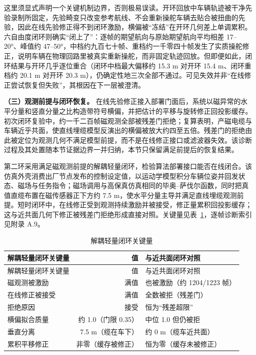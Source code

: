 这里须显式声明一个关键机制边界，否则极易误读。开环回放中车辆轨迹被干净先验录制所固定，先验畸变只改变参考航线、不会重新操舵车辆去贴合被扭曲的先验，因此在线先验修正得不到闭环激励，横偏被``冻结''在开环几何差上单调累积。六自由度闭环则确实``闭上了''：逐帧的期望航向与原始期望航向平均相差 17--20°、峰值约 47--50°，中档约九百七十帧、重档约一千零四十帧发生了实质操舵修正，说明车辆在物理回路里被真实重新操舵，而非固定轨迹回放。但即便如此，闭环结果与开环几乎逐位重合（闭环中档最大偏移约 15.3 m 对开环 15.4 m、闭环重档约 20.1 m 对开环 20.3 m），仍确定性地三次全部不通过。可见失效并非``在线修正尝试恢复但失败''，其根因在下一层被澄清。

\textbf{（三）观测前提与闭环恢复。} 在线先验修正接入部署门面后，系统以磁异常的水平分量和竖直分量之比构造带符号横偏，并把估计的平移与旋转修正回投影缓存。初次闭环复验中，约一千二百帧磁观测全部被残差门拒绝；复算表明，产磁电缆与车辆近乎共面，使直线埋缆模型反演出的横偏被放大约四至五倍。残差门的拒绝由此被定位为观测几何不满足模型前提，而不是在线修正接口或滤波器失效。该诊断过程及其处置随本节证据边界一并归纳，本节只保留满足前提后的恢复结果。

第二环采用满足磁观测前提的解耦轻量闭环，检验算法部署接口能否在线闭合。该仿真外壳消费出厂节点发布的控制设定值，以运动学模型积分车辆位姿并回发状态、磁场与任务指令；磁场调用与高保真仿真相同的毕奥--萨伐尔函数，同时把真值直缆布置在磁传感器正下方约 7.5 m，使水平分量主导并满足直线埋缆观测前提。短时闭环中，在线修正受到观测持续激励并被接受，修正量累积回投影缓存；这与近共面几何下修正被残差门拒绝形成直接对照。关键量见表~\ref{tab:ch05-decoupled-loop}，逐帧诊断索引见附录 A.9。

\begin{longtable}[]{@{}lrl@{}}
\caption{解耦轻量闭环关键量}\label{tab:ch05-decoupled-loop}\tabularnewline
\toprule\noalign{}
解耦轻量闭环关键量 & 值 & 与近共面闭环对照 \\
\midrule\noalign{}
\endfirsthead
\toprule\noalign{}
解耦轻量闭环关键量 & 值 & 与近共面闭环对照 \\
\midrule\noalign{}
\endhead
\bottomrule\noalign{}
\endlastfoot
磁观测被激励 & 满值 & 也被激励（约 1204/1223 帧） \\
在线修正被接受 & 满值 & 全数被拒（残差门） \\
拒绝原因 & 接受 & 恒为``残差超限'' \\
横偏拟合质量 & 约 1.0（门限 0.35） & 中位 1.0 但仍被拒 \\
垂直分离 & 7.5 m（缆在车下） & 约 0 m（缆车近共面） \\
累积平移修正 & 非零（缓存被修正） & 恒为零（缓存未被修正） \\
\end{longtable}

